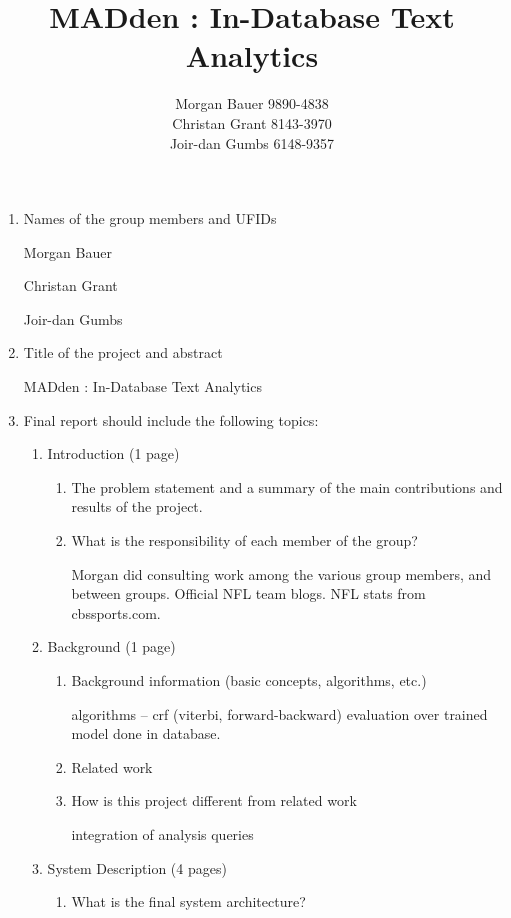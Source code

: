 \documentclass{article}
\title{MADden : In-Database Text Analytics}
\author{Morgan Bauer 9890-4838 \\
  Christan Grant 8143-3970 \\
  Joir-dan Gumbs 6148-9357}
\begin{document}
\maketitle
\begin{enumerate}
\item Names of the group members and UFIDs


  Morgan Bauer

  Christan Grant

  Joir-dan Gumbs

\item Title of the project and abstract

  MADden : In-Database Text Analytics

\item Final report should include the following topics:
  \begin{enumerate}

  \item  Introduction (1 page)
    \begin{enumerate}
    \item The problem statement and a summary of the main contributions and results of the project.
    \item What is the responsibility of each member of the group?

      Morgan did consulting work among the various group members, and between groups.
      Official NFL team blogs. NFL stats from cbssports.com.
    \end{enumerate}

  \item Background (1 page)
    \begin{enumerate}
    \item Background information (basic concepts, algorithms, etc.)

      algorithms -- crf (viterbi, forward-backward) evaluation over trained model done in database.

    \item Related work
    \item How is this project different from related work

      integration of analysis queries
    \end{enumerate}

  \item System Description (4 pages)
    \begin{enumerate}
    \item What is the final system architecture?


\end{enumerate}
\end{enumerate}
\end{enumerate}
\end{document}
